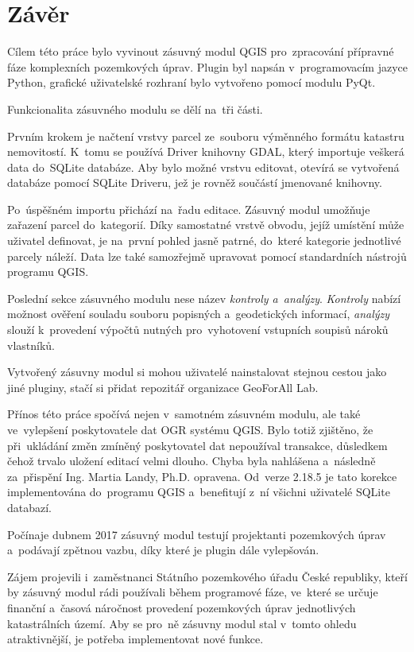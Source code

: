 \chapter{Závěr}
\label{zaver}

Cílem této práce bylo vyvinout zásuvný modul QGIS pro~zpracování přípravné fáze komplexních pozemkových úprav. Plugin byl napsán v~programovacím jazyce Python, grafické uživatelské rozhraní bylo vytvořeno pomocí modulu PyQt.

Funkcionalita zásuvného modulu se dělí na~tři části.

Prvním krokem je načtení vrstvy parcel ze~souboru výměnného formátu katastru nemovitostí. K~tomu se používá  Driver knihovny GDAL, který importuje veškerá data do~SQLite databáze. Aby bylo možné vrstvu editovat, otevírá se vytvořená databáze pomocí SQLite Driveru, jež je rovněž součástí jmenované knihovny.

Po~úspěšném importu přichází na~řadu editace. Zásuvný modul umožňuje zařazení parcel do~kategorií. Díky samostatné vrstvě obvodu, jejíž umístění může uživatel definovat, je na~první pohled jasně patrné, do~které kategorie jednotlivé parcely náleží. Data lze také samozřejmě upravovat pomocí standardních nástrojů programu QGIS.

Poslední sekce zásuvného modulu nese název \textit{kontroly a~analýzy}. \textit{Kontroly} nabízí možnost ověření souladu souboru popisných a~geodetických informací, \textit{analýzy} slouží k~provedení výpočtů nutných pro~vyhotovení vstupních soupisů nároků vlastníků.

Vytvořený zásuvny modul si mohou uživatelé nainstalovat stejnou cestou jako jiné pluginy, stačí si přidat repozitář organizace GeoForAll Lab.

Přínos této práce spočívá nejen v~samotném zásuvném modulu, ale také ve~vylepšení poskytovatele dat OGR systému QGIS. Bylo totiž zjištěno, že při~ukládání změn zmíněný poskytovatel dat nepoužíval transakce, důsledkem čehož trvalo uložení editací velmi dlouho. Chyba byla nahlášena a~následně za~přispění Ing. Martia Landy, Ph.D. opravena. Od~verze 2.18.5 je tato korekce implementována do~programu QGIS a~benefitují z~ní všichni uživatelé SQLite databazí.

Počínaje dubnem 2017 zásuvný modul testují projektanti pozemkových úprav a~podávají zpětnou vazbu, díky které je plugin dále vylepšován.

Zájem projevili i~zaměstnanci Státního pozemkového úřadu České republiky, kteří by zásuvný modul rádi používali během programové fáze, ve~které se určuje finanční a~časová náročnost provedení pozemkových úprav jednotlivých katastrálních území. Aby se pro~ně zásuvny modul stal v~tomto ohledu atraktivnější, je potřeba implementovat nové funkce.

